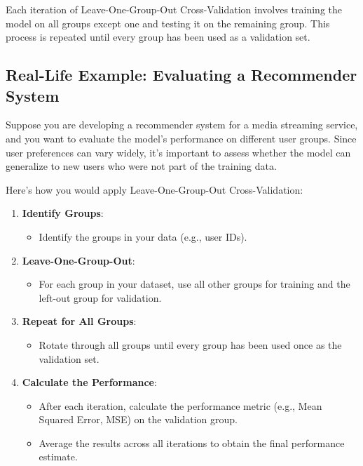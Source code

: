 \documentclass[10pt]{article}
\begin{document}
Each iteration of Leave-One-Group-Out Cross-Validation involves training the model on all groups except one and testing it on the remaining group. This process is repeated until every group has been used as a validation set.

\subsection{Real-Life Example: Evaluating a Recommender System}
Suppose you are developing a recommender system for a media streaming service, and you want to evaluate the model’s performance on different user groups. Since user preferences can vary widely, it’s important to assess whether the model can generalize to new users who were not part of the training data.

Here’s how you would apply Leave-One-Group-Out Cross-Validation:

\begin{enumerate}
    \item \textbf{Identify Groups}:
    \begin{itemize}
        \item Identify the groups in your data (e.g., user IDs).
    \end{itemize}
    \item \textbf{Leave-One-Group-Out}:
    \begin{itemize}
        \item For each group in your dataset, use all other groups for training and the left-out group for validation.
    \end{itemize}
    \item \textbf{Repeat for All Groups}:
    \begin{itemize}
        \item Rotate through all groups until every group has been used once as the validation set.
    \end{itemize}
    \item \textbf{Calculate the Performance}:
    \begin{itemize}
        \item After each iteration, calculate the performance metric (e.g., Mean Squared Error, MSE) on the validation group.
        \item Average the results across all iterations to obtain the final performance estimate.
    \end{itemize}
\end{enumerate}
\end{document}
